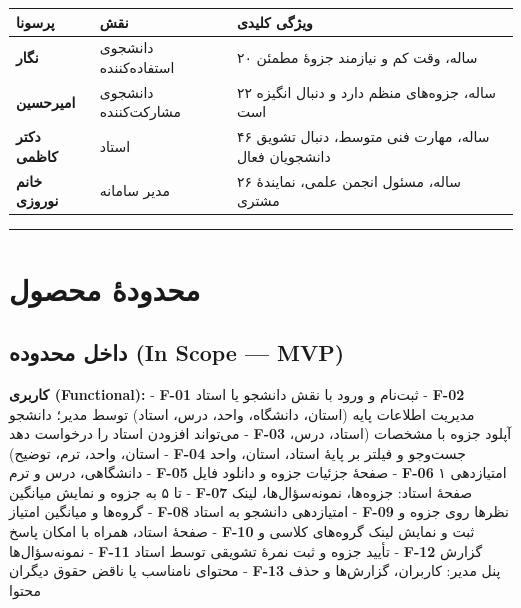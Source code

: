 \documentclass[12pt, a4paper]{article}
\begin{document}
{\def\LTcaptype{none} %
\begin{longtable}[]{@{}
  >{\raggedright\arraybackslash}p{}
  >{\raggedright\arraybackslash}p{}
  >{\raggedright\arraybackslash}p{}@{}}
\toprule\noalign{}
\begin{minipage}[b]{\linewidth}\raggedright
پرسونا
\end{minipage} & \begin{minipage}[b]{\linewidth}\raggedright
نقش
\end{minipage} & \begin{minipage}[b]{\linewidth}\raggedright
ویژگی کلیدی
\end{minipage} \\
\midrule\noalign{}
\endhead
\bottomrule\noalign{}
\endlastfoot
\textbf{نگار} & دانشجوی استفاده‌کننده & ۲۰ ساله، وقت کم و نیازمند جزوهٔ مطمئن \\
\textbf{امیرحسین} & دانشجوی مشارکت‌کننده & ۲۲ ساله، جزوه‌های منظم دارد و دنبال انگیزه است \\
\textbf{دکتر کاظمی} & استاد & ۴۶ ساله، مهارت فنی متوسط، دنبال تشویق دانشجویان فعال \\
\textbf{خانم نوروزی} & مدیر سامانه & ۲۶ ساله، مسئول انجمن علمی، نمایندهٔ مشتری \\
\end{longtable}
}

\begin{center}\rule{0.5\linewidth}{0.5pt}\end{center}

\section{محدودهٔ محصول}

\subsection{داخل محدوده (In Scope — MVP)}

\textbf{کاربری (Functional):}
- \textbf{F-01} ثبت‌نام و ورود با نقش دانشجو یا استاد
- \textbf{F-02} مدیریت اطلاعات پایه (استان، دانشگاه، واحد، درس، استاد) توسط مدیر؛ دانشجو می‌تواند افزودن استاد را درخواست دهد
- \textbf{F-03} آپلود جزوه با مشخصات (استاد، درس، استان، واحد، ترم، توضیح)
- \textbf{F-04} جست‌وجو و فیلتر بر پایهٔ استاد، استان، واحد دانشگاهی، درس و ترم
- \textbf{F-05} صفحهٔ جزئیات جزوه و دانلود فایل
- \textbf{F-06} امتیازدهی ۱ تا ۵ به جزوه و نمایش میانگین
- \textbf{F-07} صفحهٔ استاد: جزوه‌ها، نمونه‌سؤال‌ها، لینک گروه‌ها و میانگین امتیاز
- \textbf{F-08} امتیازدهی دانشجو به استاد
- \textbf{F-09} نظرها روی جزوه و صفحهٔ استاد، همراه با امکان پاسخ
- \textbf{F-10} ثبت و نمایش لینک گروه‌های کلاسی و نمونه‌سؤال‌ها
- \textbf{F-11} تأیید جزوه و ثبت نمرهٔ تشویقی توسط استاد
- \textbf{F-12} گزارش محتوای نامناسب یا ناقض حقوق دیگران
- \textbf{F-13} پنل مدیر: کاربران، گزارش‌ها و حذف محتوا
\end{document}
